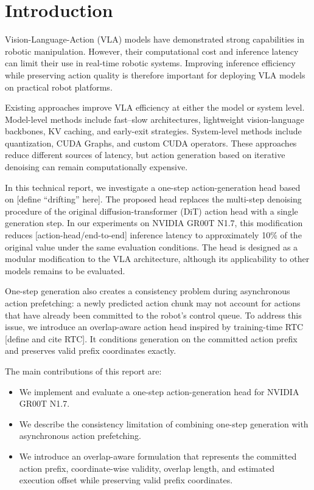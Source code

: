 \section{Introduction}

Vision-Language-Action (VLA) models have demonstrated strong capabilities
in robotic manipulation. However, their computational cost and inference
latency can limit their use in real-time robotic systems. Improving
inference efficiency while preserving action quality is therefore important
for deploying VLA models on practical robot platforms.

Existing approaches improve VLA efficiency at either the model or system
level. Model-level methods include fast--slow architectures, lightweight
vision-language backbones, KV caching, and early-exit strategies. System-level
methods include quantization, CUDA Graphs, and custom CUDA operators.
These approaches reduce different sources of latency, but action generation
based on iterative denoising can remain computationally expensive.

In this technical report, we investigate a one-step action-generation head
based on [define ``drifting'' here]. The proposed head replaces the
multi-step denoising procedure of the original diffusion-transformer
(DiT) action head with a single generation step. In our experiments on
NVIDIA GR00T N1.7, this modification reduces [action-head/end-to-end]
inference latency to approximately 10\% of the original value under the
same evaluation conditions. The head is designed as a modular modification
to the VLA architecture, although its applicability to other models remains
to be evaluated.

One-step generation also creates a consistency problem during asynchronous
action prefetching: a newly predicted action chunk may not account for
actions that have already been committed to the robot's control queue.
To address this issue, we introduce an overlap-aware action head inspired
by training-time RTC [define and cite RTC]. It conditions generation on
the committed action prefix and preserves valid prefix coordinates exactly.

The main contributions of this report are:
\begin{itemize}
    \item We implement and evaluate a one-step action-generation head for
    NVIDIA GR00T N1.7.
    \item We describe the consistency limitation of combining one-step
    generation with asynchronous action prefetching.
    \item We introduce an overlap-aware formulation that represents the
    committed action prefix, coordinate-wise validity, overlap length, and
    estimated execution offset while preserving valid prefix coordinates.
\end{itemize}
